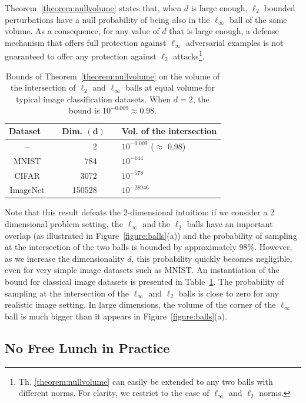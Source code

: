 Theorem~\ref{theorem:nullvolume} states that, when $d$ is large enough, $\ell_2$ bounded perturbations have a null probability of being also in the $\ell_\infty$ ball of the same volume. As a consequence, for any value of $d$ that is large enough, a defense mechanism that offers full protection against $\ell_\infty$ adversarial examples is not guaranteed to offer any protection against $\ell_2$ attacks\footnote{Th. \ref{theorem:nullvolume} can easily be extended to any two balls with different norms. For clarity, we restrict to the case of $\ell_\infty$ and $\ell_2$ norms.}.

\begin{table}[ht]
\centering
\caption{ Bounds of Theorem~\ref{theorem:nullvolume} on the volume of the intersection of  $\ell_2$ and $\ell_\infty$ balls at equal volume for typical image classification datasets. When $d=2$, the bound is $ 10^{-0.009}\approx 0.98$.}
\begin{tabular}{c r r r l}
\toprule
\textbf{Dataset\ } & \phantom{....} & \textbf{Dim.} $\mathbf{(d)}$ & \phantom{....} & \textbf{Vol. of the intersection }\\
\midrule
-- & & 2\ \ & & $10^{-0.009}$ \quad ($\approx$ 0.98) \\
MNIST & & 784\ \  & & $10^{-144}$\\
CIFAR & & 3072\ \ & &  $10^{-578}$\\
ImageNet & & 150528\ \ & & $10^{-28946}$\\
\bottomrule
\end{tabular}
\label{table:datadim}
\end{table}

Note that this result defeats the 2-dimensional intuition: if we consider a 2 dimensional problem setting, the $\ell_\infty$ and the $\ell_2$ balls have an important overlap (as illustrated in Figure~\ref{figure:balls}(a)) and the probability of sampling at the intersection of the two balls is bounded by approximately 98\%. However, as we increase the dimensionality $d$, this probability quickly becomes negligible, even for very simple image datasets such as MNIST. An instantiation of  the bound for classical image datasets is presented in Table~\ref{table:datadim}. The probability of sampling at the intersection of the $\ell_\infty$ and $\ell_2$ balls is close to zero for any realistic image setting. In large dimensions, the volume of the corner of the $\ell_\infty$ ball is much bigger than it appears in Figure~\ref{figure:balls}(a).


\subsection{No Free Lunch in Practice}

